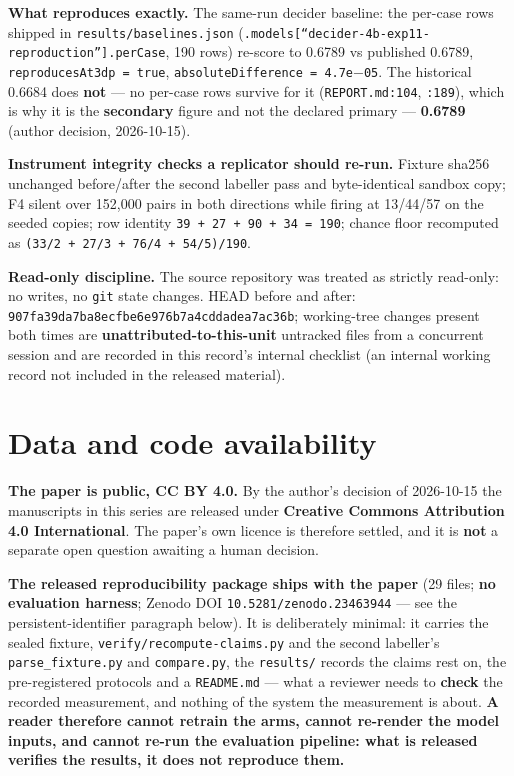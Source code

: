 \documentclass[11pt,a4paper]{article}
\begin{document}
\textbf{What reproduces exactly.} The same-run decider baseline: the per-case rows shipped in \texttt{results/baselines.json} (\texttt{.models[``decider-4b-exp11-reproduction''].perCase}, 190 rows) re-score to 0.6789 vs published 0.6789, \texttt{reproducesAt3dp = true}, \texttt{absoluteDifference = 4.7e$-$05}. The historical 0.6684 does \textbf{not} --- no per-case rows survive for it (\texttt{REPORT.md:104}, \texttt{:189}), which is why it is the \textbf{secondary} figure and not the declared primary --- \textbf{0.6789} (author decision, 2026-10-15).

\textbf{Instrument integrity checks a replicator should re-run.} Fixture sha256 unchanged before/after the second labeller pass and byte-identical sandbox copy; F4 silent over 152,000 pairs in both directions while firing at 13/44/57 on the seeded copies; row identity \texttt{39 + 27 + 90 + 34 = 190}; chance floor recomputed as \texttt{(33/2 + 27/3 + 76/4 + 54/5)/190}.

\textbf{Read-only discipline.} The source repository was treated as strictly read-only: no writes, no \texttt{git} state changes. HEAD before and after: \texttt{907fa39da7ba8ecfbe6e976b7a4cddadea7ac36b}; working-tree changes present both times are \textbf{unattributed-to-this-unit} untracked files from a concurrent session and are recorded in this record's internal checklist (an internal working record not included in the released material).

\section*{Data and code availability}

\textbf{The paper is public, CC BY 4.0.} By the author's decision of 2026-10-15 the manuscripts in this series are released under \textbf{Creative Commons Attribution 4.0 International}. The paper's own licence is therefore settled, and it is \textbf{not} a separate open question awaiting a human decision.

\textbf{The released reproducibility package ships with the paper} (29 files; \textbf{no evaluation harness}; Zenodo DOI \texttt{10.5281/zenodo.23463944} --- see the persistent-identifier paragraph below). It is deliberately minimal: it carries the sealed fixture, \texttt{verify/recompute-claims.py} and the second labeller's \texttt{parse\_fixture.py} and \texttt{compare.py}, the \texttt{results/} records the claims rest on, the pre-registered protocols and a \texttt{README.md} --- what a reviewer needs to \textbf{check} the recorded measurement, and nothing of the system the measurement is about. \textbf{A reader therefore cannot retrain the arms, cannot re-render the model inputs, and cannot re-run the evaluation pipeline: what is released verifies the results, it does not reproduce them.}
\end{document}
